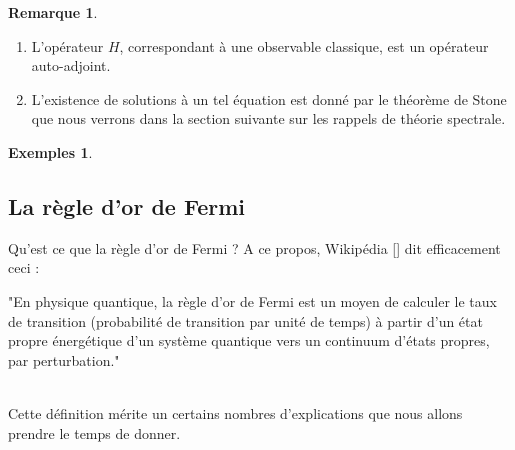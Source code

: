 \documentclass[12pt,openany,a4paper, titlepage]{article}
\theoremstyle{definition}
\theoremstyle{definition}
\theoremstyle{definition}
\theoremstyle{definition}
\newtheorem{exs}{Exemples}
\theoremstyle{definition}
\newtheorem{rem}{Remarque}
\theoremstyle{definition}
\begin{document}
\begin{rem}
    \begin{enumerate}
        \item[1] L'opérateur $H$, correspondant à une observable classique, est un opérateur auto-adjoint.
        \item[2] L'existence de solutions à un tel équation est donné par le théorème de Stone que nous verrons dans la section suivante sur les rappels de théorie spectrale.
    \end{enumerate}
\end{rem}

\begin{exs}
    
\end{exs}

\subsection{La règle d'or de Fermi} 

Qu'est ce que la règle d'or de Fermi ? A ce propos, Wikipédia [] dit efficacement ceci : \\

\begin{it}
    "En physique quantique, la règle d'or de Fermi est un moyen de calculer le taux de transition (probabilité de transition par unité de temps) à partir d'un état propre énergétique d'un système quantique vers un continuum d'états propres, par perturbation."
\end{it}\\

Cette définition mérite un certains nombres d'explications que nous allons  prendre le temps de donner. 
\end{document}
